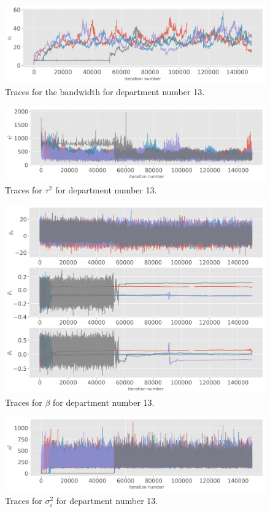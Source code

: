 \documentclass[paper=a4, fontsize=11pt]{scrartcl}
\begin{document}
\begin{figure}[!htb]\label{b}
\centering
\includegraphics[width=.8\textwidth]{project/writeup/bandwidth.png}
\caption{Traces for the bandwidth for department number 13.}\end{figure}
\begin{figure}[!htb]\label{tau}
\centering
\includegraphics[width=.8\textwidth]{project/writeup/tau.png}
\caption{Traces for $\tau^2$ for department number 13.}\end{figure}
\begin{figure}[!htb]\label{beta}
\centering
\includegraphics[width=.8\textwidth]{project/writeup/betas_traces.png}
\caption{Traces for $\beta$ for department number 13.}\end{figure}
\begin{figure}[!htb]\label{sigma}
\centering
\includegraphics[width=.8\textwidth]{project/writeup/sigma.png}
\caption{Traces for $\sigma_i^2$ for department number 13.}
\end{figure}
\end{document}
